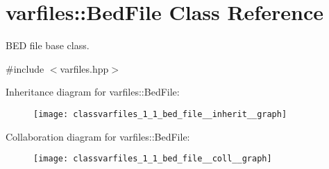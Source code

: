 \hypertarget{classvarfiles_1_1_bed_file}{}\section{varfiles\+:\+:Bed\+File Class Reference}
\label{classvarfiles_1_1_bed_file}


B\+ED file base class.  




{\ttfamily \#include $<$varfiles.\+hpp$>$}



Inheritance diagram for varfiles\+:\+:Bed\+File\+:\nopagebreak
\begin{figure}[H]
\begin{center}
\leavevmode
\texttt{[image: classvarfiles\_1\_1\_bed\_file\_\_inherit\_\_graph]}
\end{center}
\end{figure}


Collaboration diagram for varfiles\+:\+:Bed\+File\+:\nopagebreak
\begin{figure}[H]
\begin{center}
\leavevmode
\texttt{[image: classvarfiles\_1\_1\_bed\_file\_\_coll\_\_graph]}
\end{center}
\end{figure}
